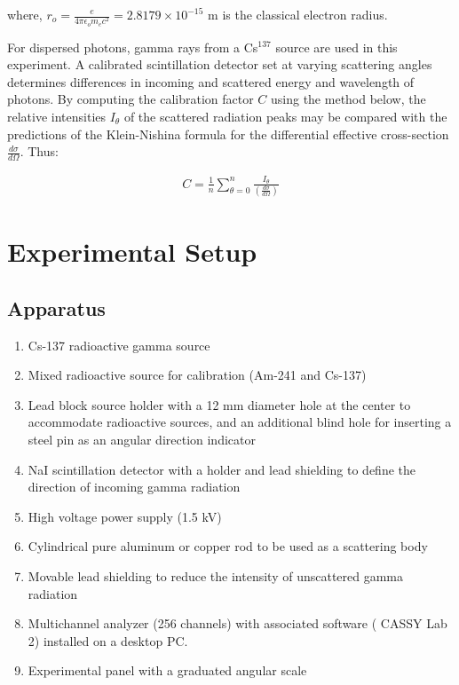 where, $r_o=\frac{e}{4\pi\epsilon_om_ec^2} = 2.8179 \times 10^{-15}$ m is the classical electron radius.

For dispersed photons, gamma rays from a Cs$^{137}$ source are used in this experiment. A calibrated scintillation detector set at varying scattering angles determines differences in incoming and scattered energy and wavelength of photons. By computing the calibration factor $C$ using the method below, the relative intensities $I_\theta$ of the scattered radiation peaks may be compared with the predictions of the Klein-Nishina formula for the differential effective cross-section $\frac{d\sigma}{d\Omega}$. Thus:

\begin{align} C=\frac{1}{n}\sum_{\theta=0}^{n}\frac{I_\theta}{\left(\frac{d\sigma}{d\Omega}\right)}\end{align}

	
\section{Experimental Setup}

\subsection*{Apparatus}

\begin{enumerate}
    \item Cs-137 radioactive gamma source
    \item Mixed radioactive source for calibration (Am-241 and Cs-137)
    \item Lead block source holder with a 12 mm diameter hole at the center to accommodate radioactive sources, and an additional blind hole for inserting a steel pin as an angular direction indicator
    \item NaI scintillation detector with a holder and lead shielding to define the direction of incoming gamma radiation
    \item High voltage power supply (1.5 kV)
    \item Cylindrical pure aluminum or copper rod to be used as a scattering body
    \item Movable lead shielding to reduce the intensity of unscattered gamma radiation
    \item Multichannel analyzer (256 channels) with associated software ( CASSY Lab 2) installed on a desktop PC.
    \item Experimental panel with a graduated angular scale\\
\end{enumerate}

